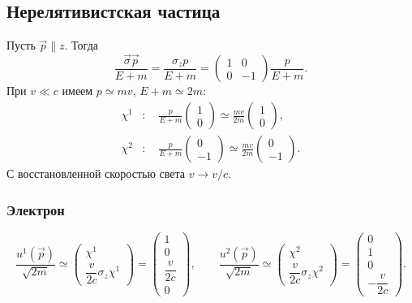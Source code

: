 \documentclass[../final.tex]{subfiles}
\begin{document}
\subsection*{Нерелятивистская частица}

Пусть $\vec p\parallel z$. Тогда
\begin{equation*}
    \frac{\vec\sigma\vec p}{E+m}
    =\frac{\sigma_zp}{E+m}
    =
    \begin{pmatrix}
        1&0\\
        0&-1
    \end{pmatrix}
    \frac{p}{E+m}.
\end{equation*}
При $v\ll c$ имеем $p\simeq mv$, $E+m\simeq2m$:
\begin{align*}
    \chi^1&:\quad
    \frac{p}{E+m}
    \begin{pmatrix}
        1\\0
    \end{pmatrix}
    \simeq\frac{mv}{2m}
    \begin{pmatrix}
        1\\0
    \end{pmatrix},\\
    \chi^2&:\quad
    \frac{p}{E+m}
    \begin{pmatrix}
        0\\-1
    \end{pmatrix}
    \simeq\frac{mv}{2m}
    \begin{pmatrix}
        0\\-1
    \end{pmatrix}.
\end{align*}
С восстановленной скоростью света $v\to v/c$.

\subsubsection*{Электрон}

\begin{equation*}
    \frac{u^{1}(\vec p)}{\sqrt{2m}}
    \simeq
    \begin{pmatrix}
        \chi^1\\[0.2em]
        \dfrac{v}{2c}\sigma_z\chi^1
    \end{pmatrix}
    =
    \begin{pmatrix}
        1\\0\\ \dfrac{v}{2c}\\0
    \end{pmatrix},
    \qquad
    \frac{u^{2}(\vec p)}{\sqrt{2m}}
    \simeq
    \begin{pmatrix}
        \chi^2\\[0.2em]
        \dfrac{v}{2c}\sigma_z\chi^2
    \end{pmatrix}
    =
    \begin{pmatrix}
        0\\1\\0\\ -\dfrac{v}{2c}
    \end{pmatrix}.
\end{equation*}
\end{document}
